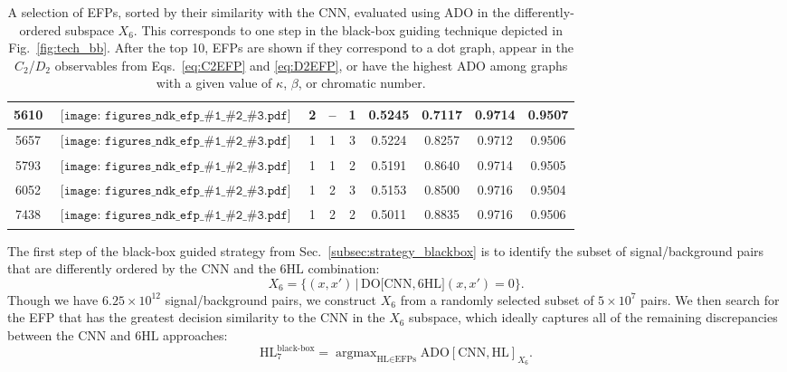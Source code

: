 \documentclass[aps,prd,twocolumn,superscriptaddress,preprintnumbers,nofootinbib,longbibliography,floatfix]{revtex4-1}
\newcommand{\CNN}{\text{CNN}}
\newcommand{\DO}{\text{DO}}
\newcommand{\HL}{\text{HL}}
\newcommand{\ADO}{\text{ADO}}
\DeclareMathOperator*{\argmax}{argmax}
\newcommand{\Fig}[1]{Fig.~\ref{#1}}
\newcommand{\Sec}[1]{Sec.~\ref{#1}}
\newcommand{\Eqs}[2]{Eqs.~\eqref{#1} and \eqref{#2}}
\newcommand{\tndk}[3]{
	\begin{gathered}\texttt{[image: figures\_ndk\_efp\_\#1\_\#2\_\#3.pdf]}\end{gathered}
}
\begin{document}
\begin{table*}
\begin{tabular}{c|cccc|cc|cc}
5610 & $\tndk{1}{0}{0}$ & 2 & -- & 1 & 0.5245 & 0.7117 & 0.9714 & 0.9507 \\
\hline
5657 & $\tndk{3}{3}{1}$ & 1 & 1 & 3 & 0.5224 & 0.8257 & 0.9712 & 0.9506 \\
5793 & $\tndk{2}{1}{0}$ & 1 & 1 & 2 & 0.5191 & 0.8640 & 0.9714 & 0.9505 \\
6052 & $\tndk{3}{3}{1}$ & 1 & 2 & 3 & 0.5153 & 0.8500 & 0.9716 & 0.9504 \\
7438 & $\tndk{2}{1}{0}$ & 1 & 2 & 2 & 0.5011 & 0.8835 & 0.9716 & 0.9506 \\
\hline \hline
\end{tabular}
	\centering
	\caption{A selection of EFPs, sorted by their similarity  with the CNN, evaluated using ADO in the differently-ordered subspace $X_6$. This corresponds to one step in the black-box guiding technique depicted in \Fig{fig:tech_bb}. After the top 10, EFPs are shown if they correspond to a dot graph, appear in the $C_2$/$D_2$ observables from \Eqs{eq:C2EFP}{eq:D2EFP}, or have the highest ADO among graphs with a given value of $\kappa$, $\beta$, or chromatic number.}
	\label{tab:EFPvsBB}
\end{table*}

The first step of the black-box guided strategy from \Sec{subsec:strategy_blackbox} is to identify the subset of signal/background pairs that are differently ordered by the $\CNN$ and the $6\HL$ combination:
\begin{equation}
	X_6 = \Big\{ (x,x') \, \Big| \, \DO\big[\CNN, 6\HL \big](x,x') = 0 \Big\}.
\end{equation}
Though we have $6.25 \times 10^{12}$ signal/background pairs, we construct $X_6$ from a randomly selected subset of $5 \times 10^7$ pairs. We then search for the EFP that has the greatest decision similarity to the $\CNN$ in the $X_6$ subspace, which ideally captures all of the remaining discrepancies between the $\CNN$ and $6\HL$ approaches:
\begin{equation}
	\label{eq:HL7_def}
	\HL^{\text{black-box}}_7 = \argmax_{\HL \in \text{EFPs}} \ADO[\CNN, \HL]_{X_6}.
\end{equation}
\end{document}
